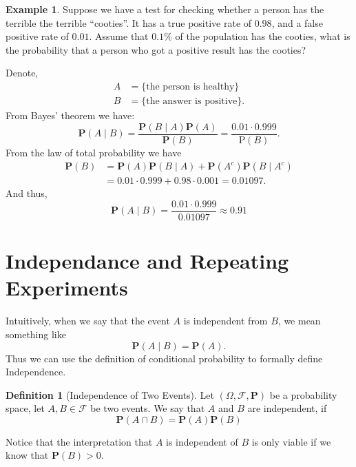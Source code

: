 \documentclass[11pt,a4paper]{article}
\theoremstyle{definition}
\newtheorem{definition}{Definition}[section]
\newtheorem{example}{Example}[section]
\theoremstyle{plain}
\begin{document}
  \begin{example}
    Suppose we have a test for checking whether a person has the terrible 
    the terrible ``cooties''.
    It has a true positive rate of $0.98$, and a false positive rate of
    $0.01$. Assume that $0.1\%$ of the population has the cooties,
    what is the probability that a person who got a positive result
    has the cooties?

    Denote,
    \begin{align*}
      A &= \{\text{the person is healthy}\} \\
      B &= \{\text{the answer is positive}\}.
    \end{align*}
    From Bayes' theorem we have:
    \[
      \mathbf{P}(A \mid B) = 
      {\frac{\mathbf{P}(B \mid A)\mathbf{P}(A)}{\mathbf{P}(B)}} = 
      {\frac{0.01\cdot0.999}{\mathrm{P}(B)}}.
    \]
    From the law of total probability we have
    \begin{align*}
      \mathbf{P}(B) &= 
      \mathbf{P}(A)\mathbf{P}(B \mid A) + 
      \mathbf{P}(A^{c})\mathbf{P}(B \mid A^{c}) \\ &= 
      0.01\cdot0.999+0.98\cdot0.001=0.01097.
    \end{align*}
    And thus,
    \[ \mathbf{P}(A \mid B)={\frac{0.01\cdot0.999}{0.01097}} \approx 0.91 \]
  \end{example}


  \newpage

  \section{Independance and Repeating Experiments}
  Intuitively, when we say that the event $A$ is independent from $B$,
  we mean something like
  \[
    \mathbf P(A \mid B) = \mathbf P(A).
  \]
  Thus we can use the definition of conditional probability to formally define
  Independence.
  \begin{definition}[Independence of Two Events]
    Let $(\Omega, \mathcal F, \mathbf P)$ be a probability space, let 
    $A,B \in \mathcal F$ be two events. We say that $A$ and $B$ are independent,
    if
    \[
      \mathbf P(A \cap B) = \mathbf P(A) \mathbf P(B)
    \]
  \end{definition}
  Notice that the interpretation that $A$ is independent of $B$ is only viable
  if we know that $\mathbf P(B) > 0$.

\end{document}
